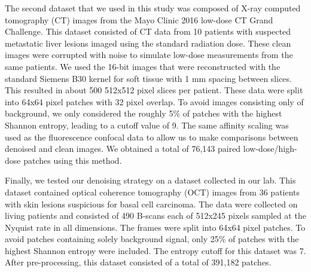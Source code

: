 \documentclass[12pt]{spieman}
\begin{document}
\begin{spacing}{2}
The second dataset that we used in this study was composed of X-ray computed tomography (CT) images from the Mayo Clinic 2016 low-dose CT Grand Challenge\cite{McCollough2017}. This dataset consisted of CT data from 10 patients with suspected metastatic liver lesions imaged using the standard radiation dose. These clean images were corrupted with noise to simulate low-dose measurements from the same patients. We used the 16-bit images that were reconstructed with the standard Siemens B30 kernel for soft tissue with 1 mm spacing between slices. This resulted in about 500 512x512 pixel slices per patient. These data were split into 64x64 pixel patches with 32 pixel overlap. To avoid images consisting only of background, we only considered the roughly 5\% of patches with the highest Shannon entropy, leading to a cutoff value of 9. The same affinity scaling was used as the fluorescence confocal data to allow us to make comparisons between denoised and clean images. We obtained a total of 76,143 paired low-dose/high-dose patches using this method. 

Finally, we tested our denoising strategy on a dataset collected in our lab. This dataset contained optical coherence tomography (OCT) images from 36 patients with skin lesions suspicious for basal cell carcinoma. The data were collected on living patients and consisted of 490 B-scans each of 512x245 pixels sampled at the Nyquist rate in all dimensions\cite{Iftimia2017a}. The frames were split into 64x64 pixel patches. To avoid patches containing solely background signal, only 25\% of patches with the highest Shannon entropy were included. The entropy cutoff for this dataset was 7. After pre-processing, this dataset consisted of a total of 391,182 patches. 


\end{spacing}
\end{document}
